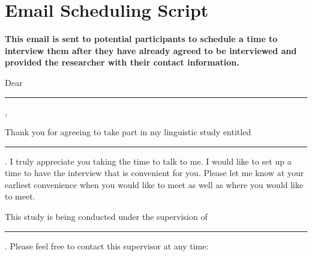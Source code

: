 
\ifdefined \setting
\else
  \newcommand{\setting}[1]{\textbf{#1}}
\fi

\section{Email Scheduling Script}
  \setting{This email is sent to potential participants to schedule a time to interview them after they have already agreed to be interviewed and provided the researcher with their contact information.}

  \noindent{}Dear \rule{3cm}{0.4pt},

  \noindent{}Thank you for agreeing to take part in my linguistic study entitled \rule{3cm}{0.4pt}.
  I truly appreciate you taking the time to talk to me.
  I would like to set up a time to have the interview that is convenient for you.
  Please let me know at your earliest convenience when you would like to meet as well as where you would like to meet.

  This study is being conducted under the supervision of \rule{3cm}{0.4pt}.
  Please feel free to contact this supervisor at any time:
  
